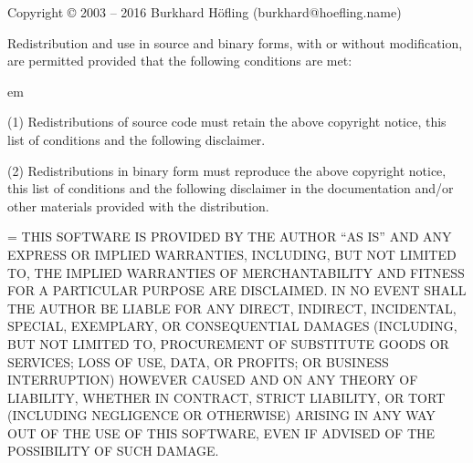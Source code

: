 

Copyright © 2003 -- 2016 Burkhard Höfling (burkhard@hoefling.name)

Redistribution and use in source and binary forms, with or without
modification, are permitted provided that the following conditions are
met:

{ em
\item{(1)} Redistributions of source code must retain the above copyright
    notice, this list of conditions and the following disclaimer. 

\item{(2)} Redistributions in binary form must reproduce the above copyright
    notice, this list of conditions and the following disclaimer in
    the documentation and/or other materials provided with the
    distribution. \par}
    
{\emergencystretch=\hsize  {}
THIS SOFTWARE IS PROVIDED BY THE AUTHOR ``AS IS'' AND ANY EXPRESS OR
IMPLIED WARRANTIES, INCLUDING, BUT NOT LIMITED TO, THE IMPLIED
WARRANTIES OF MERCHANTABILITY AND FITNESS FOR A PARTICULAR PURPOSE ARE
DISCLAIMED. IN NO EVENT SHALL THE AUTHOR BE LIABLE FOR ANY DIRECT,
INDIRECT, INCIDENTAL, SPECIAL, EXEMPLARY, OR CONSEQUENTIAL DAMAGES
(INCLUDING, BUT NOT LIMITED TO, PROCUREMENT OF SUBSTITUTE GOODS OR
SERVICES; LOSS OF USE, DATA, OR PROFITS; OR BUSINESS INTERRUPTION)
HOWEVER CAUSED AND ON ANY THEORY OF LIABILITY, WHETHER IN CONTRACT,
STRICT LIABILITY, OR TORT (INCLUDING NEGLIGENCE OR OTHERWISE) ARISING
IN ANY WAY OUT OF THE USE OF THIS SOFTWARE, EVEN IF ADVISED OF THE
POSSIBILITY OF SUCH DAMAGE.\par}

